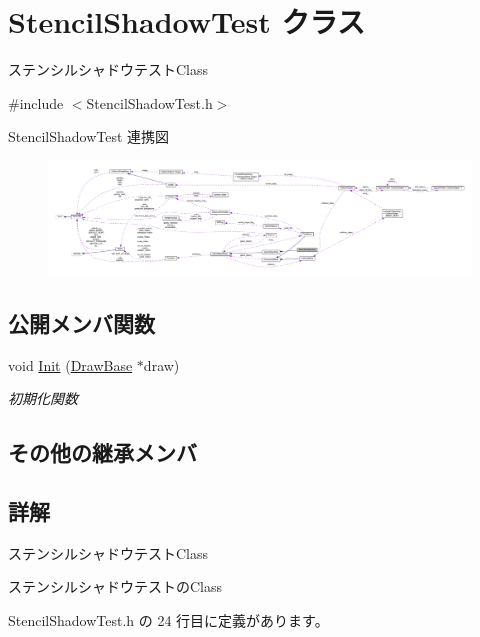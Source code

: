 \hypertarget{class_stencil_shadow_test}{}\section{Stencil\+Shadow\+Test クラス}
\label{class_stencil_shadow_test}


ステンシルシャドウテスト\+Class  




{\ttfamily \#include $<$Stencil\+Shadow\+Test.\+h$>$}



Stencil\+Shadow\+Test 連携図\nopagebreak
\begin{figure}[H]
\begin{center}
\leavevmode
\includegraphics[width=350pt]{class_stencil_shadow_test__coll__graph}
\end{center}
\end{figure}
\subsection*{公開メンバ関数}
\begin{DoxyCompactItemize}
\item 
void \mbox{\hyperlink{class_stencil_shadow_test_a4a58695fafd134d750eb23ee5ec2bdb6}{Init}} (\mbox{\hyperlink{class_draw_base}{Draw\+Base}} $\ast$draw)
\begin{DoxyCompactList}\small\item\em 初期化関数 \end{DoxyCompactList}\end{DoxyCompactItemize}
\subsection*{その他の継承メンバ}


\subsection{詳解}
ステンシルシャドウテスト\+Class 

ステンシルシャドウテストの\+Class 

 Stencil\+Shadow\+Test.\+h の 24 行目に定義があります。



